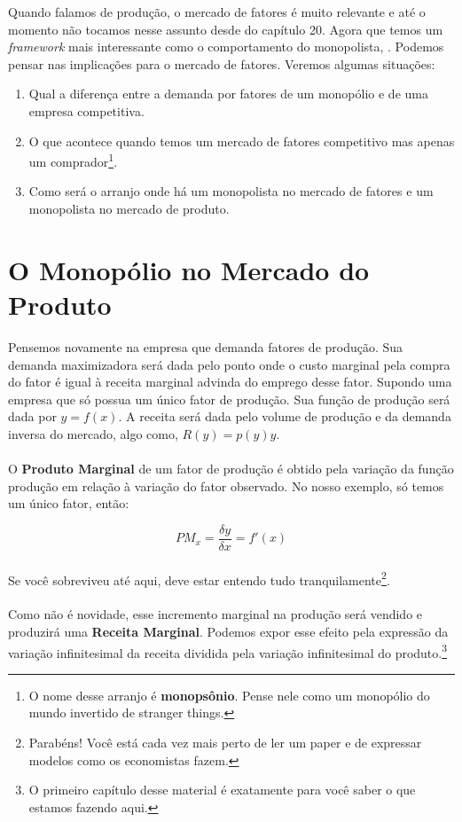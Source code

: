 \documentclass[a4paper,11pt,oneside]{book}
\theoremstyle{definition}
\theoremstyle{break}
\begin{document}
Quando falamos de produção, o mercado de fatores é muito relevante e até o momento não tocamos nesse assunto desde do capítulo 20. Agora que temos um \textit{framework} mais interessante como o comportamento do monopolista,
. Podemos pensar nas implicações para o mercado de fatores. Veremos algumas situações: 
\begin{enumerate}
	\item Qual a diferença entre a demanda por fatores de um monopólio e de uma empresa competitiva.

	\item O que acontece quando temos um mercado de fatores competitivo mas apenas um comprador\footnote{O nome desse arranjo é \textbf{monopsônio}. Pense nele como um monopólio do mundo invertido de stranger things.}.

	\item Como será o arranjo onde há um monopolista no mercado de fatores e um monopolista no mercado de produto.
\end{enumerate}

\section{O Monopólio no Mercado do Produto}

Pensemos novamente na empresa que demanda fatores de produção. Sua demanda maximizadora será dada pelo ponto onde o custo marginal pela compra do fator é igual à receita marginal advinda do emprego desse fator. Supondo uma empresa que só possua um único fator de produção. Sua função de produção será dada por $y = f(x)$. A receita será dada pelo volume de produção e da demanda inversa do mercado, algo como, $R(y) = p(y)y$. 
\\
\\
O \textbf{Produto Marginal} de um fator de produção é obtido pela variação da função produção em relação à variação do fator observado. No nosso exemplo, só temos um único fator, então:

$$ PM_x = \frac{\delta y}{\delta x} = f'(x) $$
\\
Se você sobreviveu até aqui, deve estar entendo tudo tranquilamente\footnote{Parabéns! Você está cada vez mais perto de ler um paper e de expressar modelos como os economistas fazem.}. 
\\
\\
Como não é novidade, esse incremento marginal na produção será vendido e produzirá uma \textbf{Receita Marginal}. Podemos expor esse efeito pela expressão da  variação infinitesimal da receita dividida pela variação infinitesimal do produto.\footnote{O primeiro capítulo desse material é exatamente para você saber o que estamos fazendo aqui.}
\end{document}
